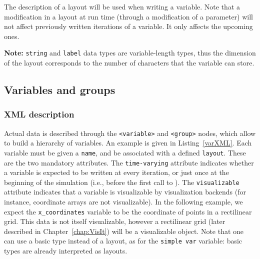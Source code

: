The description of a layout will be used when writing a variable. Note that a modification in 
a layout at run time (through a modification of a parameter) will not affect previously written iterations of a
variable. It only affects the upcoming ones.

\noindent\begin{minipage}{\textwidth}
\vspace{0.5cm}

\end{minipage}

\textbf{Note:} \texttt{string} and \texttt{label} data types are variable-length types, thus
the dimension of the layout corresponds to the number of characters that the variable can store.

\subsection{Variables and groups}

\subsubsection{XML description}

Actual data is described through the \texttt{<variable>} and \texttt{<group>} nodes, which
allow to build a hierarchy of variables. An example is given in Listing~\ref{varXML}.
Each variable must be given a \texttt{name}, and be associated with a defined \texttt{layout}.
These are the two mandatory attributes. The \texttt{time-varying} attribute indicates whether
a variable is expected to be written at every iteration, or just once at the beginning of the
simulation (i.e., before the first call to ). 
The \texttt{visualizable} attribute indicates that a variable is visualizable
by visualization backends (for instance, coordinate arrays are not visualizable). 
In the following example, we expect the \texttt{x\_coordinates} variable
to be the coordinate of points in a rectilinear grid. This data is not itself visualizable, however
a rectilinear grid (later described in Chapter~\ref{chap:VisIt}) will be a visualizable object.
Note that one can use a basic type instead of a layout, as for the \texttt{simple var} variable: 
basic types are already interpreted as layouts.

\noindent\begin{minipage}{\textwidth}
\vspace{0.5cm}

\end{minipage}

